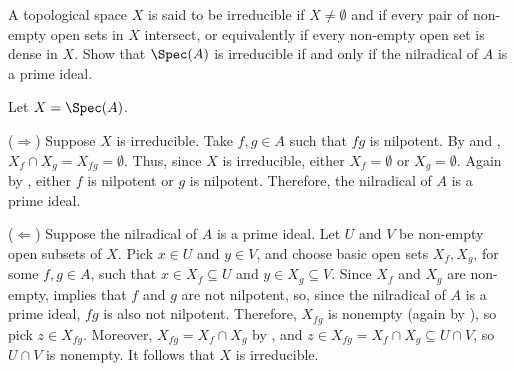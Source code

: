 \begin{exercise}
A topological space \(X\) is said to be irreducible if \(X \neq \emptyset\) and if every pair of non-empty open sets in \(X\) intersect, or equivalently if every non-empty open set is dense in \(X\).
Show that \(\Spec(A)\) is irreducible if and only if the nilradical of \(A\) is a prime ideal.
\end{exercise}

\begin{solution}
Let \(X = \Spec(A)\).

(\(\Rightarrow\))
Suppose \(X\) is irreducible.
Take \(f, g \in A\) such that \(f g\) is nilpotent.
By  and , \(X_f \cap X_g = X_{f g} = \emptyset\).
Thus, since \(X\) is irreducible, either \(X_f = \emptyset\) or \(X_g = \emptyset\).
Again by , either \(f\) is nilpotent or \(g\) is nilpotent.
Therefore, the nilradical of \(A\) is a prime ideal.

(\(\Leftarrow\))
Suppose the nilradical of \(A\) is a prime ideal.
Let \(U\) and \(V\) be non-empty open subsets of \(X\).
Pick \(x \in U\) and \(y \in V\), and choose basic open sets \(X_f, X_g\), for some \(f, g \in A\), such that \(x \in X_f \subseteq U\) and \(y \in X_g \subseteq V\).
Since \(X_f\) and \(X_g\) are non-empty,  implies that \(f\) and \(g\) are not nilpotent, so, since the nilradical of \(A\) is a prime ideal, \(f g\) is also not nilpotent.
Therefore, \(X_{f g}\) is nonempty (again by ), so pick \(z \in X_{f g}\).
Moreover, \(X_{f g} = X_f \cap X_g\) by , and \(z \in X_{f g} = X_f \cap X_g \subseteq U \cap V\), so \(U \cap V\) is nonempty.
It follows that \(X\) is irreducible.
\end{solution}